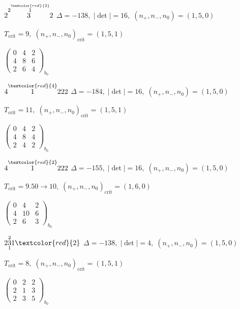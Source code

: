 \documentclass[10pt]{article}
\begin{document}
\smallskip

$2\overset{2\overset{\textcolor{red}{2}}{1}}{3}2$ \quad $\Delta=-138,\; |\det|=16,\; (n_+,n_-,n_0)=(1,5,0)$

\hspace{1em}$T_{\text{crit}}=9,\; (n_+,n_-,n_0)_{\text{crit}}=(1,5,1)$

\hspace{2em}$\left(\begin{smallmatrix}0 & 4 & 2 \\ 4 & 8 & 6 \\ 2 & 6 & 4\end{smallmatrix}\right)_{\!b_0}$

\smallskip

$4\overset{\textcolor{red}{4}}{1}222$ \quad $\Delta=-184,\; |\det|=16,\; (n_+,n_-,n_0)=(1,5,0)$

\hspace{1em}$T_{\text{crit}}=11,\; (n_+,n_-,n_0)_{\text{crit}}=(1,5,1)$

\hspace{2em}$\left(\begin{smallmatrix}0 & 4 & 2 \\ 4 & 8 & 4 \\ 2 & 4 & 2\end{smallmatrix}\right)_{\!b_0}$

$4\overset{\textcolor{red}{2}}{1}222$ \quad $\Delta=-155,\; |\det|=16,\; (n_+,n_-,n_0)=(1,5,0)$

\hspace{1em}$T_{\text{crit}}=9.50 \to 10,\; (n_+,n_-,n_0)_{\text{crit}}=(1,6,0)$

\hspace{2em}$\left(\begin{smallmatrix}0 & 4 & 2 \\ 4 & 10 & 6 \\ 2 & 6 & 3\end{smallmatrix}\right)_{\!b_0}$

\smallskip

$2\overset{2}{\underset{1}{3}}1\textcolor{red}{2}$ \quad $\Delta=-138,\; |\det|=4,\; (n_+,n_-,n_0)=(1,5,0)$

\hspace{1em}$T_{\text{crit}}=8,\; (n_+,n_-,n_0)_{\text{crit}}=(1,5,1)$

\hspace{2em}$\left(\begin{smallmatrix}0 & 2 & 2 \\ 2 & 1 & 3 \\ 2 & 3 & 5\end{smallmatrix}\right)_{\!b_0}$
\end{document}
